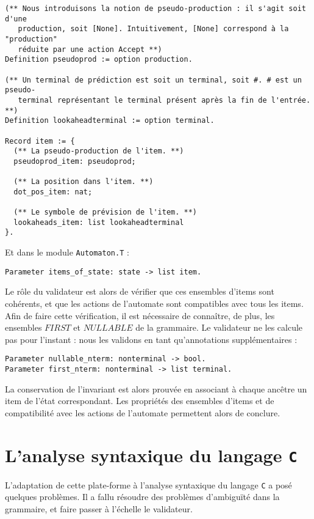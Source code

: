\documentclass[a4paper,11pt]{article}
\begin{document}
\begin{verbatim}
(** Nous introduisons la notion de pseudo-production : il s'agit soit d'une
   production, soit [None]. Intuitivement, [None] correspond à la "production"
   réduite par une action Accept **)
Definition pseudoprod := option production.

(** Un terminal de prédiction est soit un terminal, soit #. # est un pseudo-
   terminal représentant le terminal présent après la fin de l'entrée. **)
Definition lookaheadterminal := option terminal.

Record item := {
  (** La pseudo-production de l'item. **)
  pseudoprod_item: pseudoprod;

  (** La position dans l'item. **)
  dot_pos_item: nat;

  (** Le symbole de prévision de l'item. **)
  lookaheads_item: list lookaheadterminal
}.
\end{verbatim}

Et dans le module \verb+Automaton.T+ :

\begin{verbatim}
Parameter items_of_state: state -> list item.
\end{verbatim}

Le rôle du validateur est alors de vérifier que ces ensembles d'items
sont cohérents, et que les actions de l'automate sont compatibles avec
tous les items. Afin de faire cette vérification, il est nécessaire de
connaître, de plus, les ensembles $FIRST$ et $NULLABLE$ de la
grammaire. Le validateur ne les calcule pas pour l'instant : nous
les validons en tant qu'annotations supplémentaires :

\begin{verbatim}
Parameter nullable_nterm: nonterminal -> bool.
Parameter first_nterm: nonterminal -> list terminal.
\end{verbatim}

La conservation de l'invariant est alors prouvée en associant à chaque
ancêtre un item de l'état correspondant. Les propriétés des ensembles
d'items et de compatibilité avec les actions de l'automate permettent
alors de conclure.

\section{L'analyse syntaxique du langage \texttt{C}}

L'adaptation de cette plate-forme à l'analyse syntaxique du langage
\texttt{C} a posé quelques problèmes. Il a fallu résoudre des problèmes
d'ambiguïté dans la grammaire, et faire passer à l'échelle le validateur.
\end{document}
